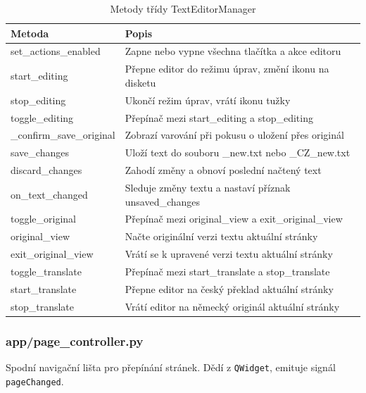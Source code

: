 \documentclass[FM,Proj]{tulthesis}
\begin{document}
\begin{table}[H]
	\centering
	\caption{Metody třídy TextEditorManager}
	\begin{tabularx}{\textwidth}{|l|X|}
		\hline
		\textbf{Metoda} & \textbf{Popis} \\ \hline
		set\_actions\_enabled     & Zapne nebo vypne všechna tlačítka a akce editoru \\ \hline
		start\_editing            & Přepne editor do režimu úprav, změní ikonu na disketu \\ \hline
		stop\_editing             & Ukončí režim úprav, vrátí ikonu tužky \\ \hline
		toggle\_editing           & Přepínač mezi start\_editing a stop\_editing \\ \hline
		\_confirm\_save\_original & Zobrazí varování při pokusu o uložení přes originál \\ \hline
		save\_changes             & Uloží text do souboru \_new.txt nebo \_CZ\_new.txt \\ \hline
		discard\_changes          & Zahodí změny a obnoví poslední načtený text \\ \hline
		on\_text\_changed         & Sleduje změny textu a nastaví příznak unsaved\_changes \\ \hline
		toggle\_original          & Přepínač mezi original\_view a exit\_original\_view \\ \hline
		original\_view            & Načte originální verzi textu aktuální stránky \\ \hline
		exit\_original\_view      & Vrátí se k upravené verzi textu aktuální stránky \\ \hline
		toggle\_translate         & Přepínač mezi start\_translate a stop\_translate \\ \hline
		start\_translate          & Přepne editor na český překlad aktuální stránky \\ \hline
		stop\_translate           & Vrátí editor na německý originál aktuální stránky \\ \hline
	\end{tabularx}
	\label{tab:texteditormanager}
\end{table}

\subsubsection{app/page\_controller.py}

Spodní navigační lišta pro přepínání stránek. Dědí z \texttt{QWidget},
emituje signál \texttt{pageChanged}.
\end{document}
